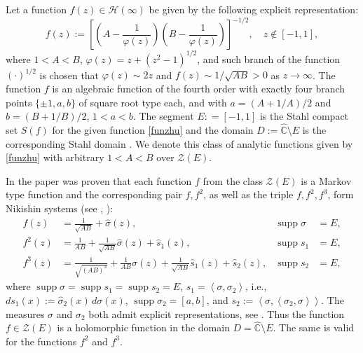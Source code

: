\documentclass[11pt, a4paper, twoside]{article}
\def\({\left(}
\def\){\right)}
\def\[{\left[}
\def\]{\right]}
\def\<{\left\langle}
\def\>{\right\rangle}
\let\myh\widehat
\def\CC{\mathbb C}
\def\HH{\mathscr H}
\def\supp{\operatorname{supp}}
\theoremstyle{plain}
\theoremstyle{definition}
\begin{document}
\subsection{}\label{s1s1}
Let a function $f(z)\in\HH(\infty)$ be given by the following explicit representation:
\begin{equation}
f(z):=\[\(A-\frac1{\varphi(z)}\)\(B-\frac1{\varphi(z)}\)\]^{-1/2},
\quad z\notin[-1,1],
\label{funzhu}
\end{equation}
where $1<A<B$, $\varphi(z)=z+(z^ 2-1)^{1/2}$, and such branch of the function $(\cdot)^{1/2}$ is chosen that $\varphi(z)\sim 2z$ and $f(z)\sim1/\sqrt{AB}>0$ as $z\to\infty$. The function $f$ is an algebraic function of the fourth order with exactly four branch points $\{\pm1,a,b\}$ of square root type each, and with $a=(A+1/A)/2$ and $b=(B+1/B)/2$, $1<a<b$. The segment $ E: = [-1,1]$  is the Stahl compact set  $S (f)$ for the given function \eqref {funzhu} and the domain $D:=\myh{\CC}\setminus{E}$ is the corresponding Stahl domain \cite{Sta97b}. We  denote this class of analytic functions given by \eqref{funzhu}  with arbitrary $1<A<B$ over $\mathscr Z (E)$.

In the paper \cite {Sue18c} was proven that each function  $f$ from the class $\mathscr Z(E)$ is a Markov type function  and  the corresponding pair $ f, f ^ 2$, as well as the triple $ f, f^2,f^3$, form Nikishin systems  (see \cite{NiSo88}, \cite{ApLy21}):
\begin{align}
f(z)&=\frac1{\sqrt{AB}}+\myh{\sigma}(z), & \supp{\sigma}&=E,\label {repf}\\
f^2(z)&=\frac1{AB}+\frac1{\sqrt{AB}}\myh{\sigma}(z) +\myh{s}_1(z), & \supp{s_1}&=E,\label {repf2}\\
f^3(z)&=\frac1{\sqrt{(AB)^3}}+\frac1{AB}\myh{\sigma}(z)+\frac1{\sqrt{AB}}\myh{s}_1(z)+\myh{s}_2(z), & \supp{s_2}&=E,
\label {repf3}
\end{align}
where $\supp\sigma=\supp{s}_1=\supp{s}_2=E$, $s_1=\<\sigma,\sigma_2\>$, i.e., $ds_1(x):=\myh{\sigma}_2(x)\,d\sigma(x)$, $\supp{\sigma_2}=[a,b]$, and $s_2:=\<\sigma,\<\sigma_2,\sigma\>\>$. The measures $\sigma$ and $\sigma_2$ both admit  explicit representations, see \cite[equations (16)--(17)]{Sue18c}.
Thus the function $f\in\mathscr Z(E)$ is a holomorphic function in the domain $D=\myh{\CC}\setminus E$. The same is valid for the functions $f^2$ and $f^3$.

\fancyhf{}
\fancyhead[LE]{\small\thepage}
\fancyhead[RO]{\small\thepage}
\end{document}
